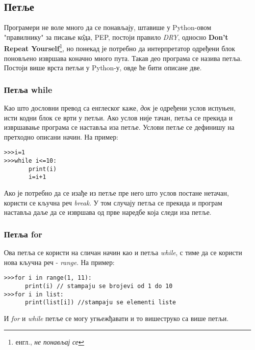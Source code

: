 \subsection{Петље}
		Програмери не воле много да се понављају, штавише у Python-овом "правилнику" за писање к\^{о}да, PEP\cite{PEP}, постоји правило \emph{DRY}, односно \textbf{Don't Repeat Yourself}\footnote{енгл., \emph{не понављај се}}, но понекад је потребно да интерпретатор одређени блок поновљено извршава коначно много пута. Такав део програма се назива петља. Постоји више врста петљи у Python-у, овде ће бити описане две. 
		\subsubsection{Петља while}
		Као што дословни превод са енглеског каже, \emph{док} је одређени услов испуњен, исти кодни блок се врти у петљи. Ако услов није тачан, петља се прекида и извршавање програма се наставља иза петље. Услови петље се дефинишу на претходно описани начин. На пример:
		\begin{lstlisting}[caption = Пример while петље, label = while]
>>>i=1
>>>while i<=10:
       print(i)
       i=i+1
		\end{lstlisting}
		Ако је потребно да се изађе из петље пре него што услов постане нетачан, користи се кључна реч \emph{break}. У том случају петља се прекида и програм наставља даље да се извршава од прве наредбе која следи иза петље. 
		\pagebreak
		\subsubsection{Петља for}
		Ова петља се користи на сличан начин као и петља \emph{while}, с тиме да се користи нова кључна реч - \emph{range}. На пример:
		\begin{lstlisting}[caption = Примери \emph{for} петље, label = for]
>>>for i in range(1, 11):
      print(i) // stampaju se brojevi od 1 do 10
>>>for i in list:
      print(list[i]) //stampaju se elementi liste
		\end{lstlisting}
		И \emph{for} и \emph{while} петље се могу угњежђавати и то вишеструко са више петљи.